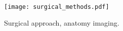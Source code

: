 \documentclass[]{article}
\begin{document}
\begin{figure}[H]
\begin{center}
\texttt{[image: surgical\_methods.pdf]}
\caption{Surgical approach, anatomy imaging.} %
\end{center}
\end{figure}

\end{document}
